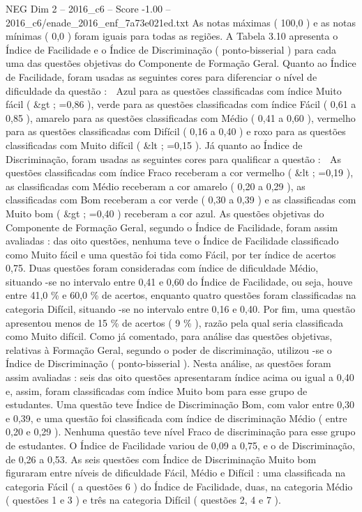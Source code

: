 \begin{textsample}{NEG Dim 2 – 2016\_c6 – Score -1.00 – 2016\_c6/enade\_2016\_enf\_7a73e021ed.txt}
As notas máximas ( 100,0 ) e as notas mínimas ( 0,0 ) foram iguais para todas as regiões.
A Tabela 3.10 apresenta o Índice de Facilidade e o Índice de Discriminação ( ponto-bisserial ) para cada uma das questões objetivas do Componente de Formação Geral.
Quanto ao Índice de Facilidade, foram usadas as seguintes cores para diferenciar o nível de dificuldade da questão :  Azul para as questões classificadas com índice Muito fácil ( \&gt ; =0,86 ), verde para as questões classificadas com índice Fácil ( 0,61 a 0,85 ), amarelo para as questões classificadas com Médio ( 0,41 a 0,60 ), vermelho para as questões classificadas com Difícil ( 0,16 a 0,40 ) e roxo para as questões classificadas com Muito difícil ( \&lt ; =0,15 ).
Já quanto ao Índice de Discriminação, foram usadas as seguintes cores para qualificar a questão :  As questões classificadas com índice Fraco receberam a cor vermelho ( \&lt ; =0,19 ), as classificadas com Médio receberam a cor amarelo ( 0,20 a 0,29 ), as classificadas com Bom receberam a cor verde ( 0,30 a 0,39 ) e as classificadas com Muito bom ( \&gt ; =0,40 ) receberam a cor azul.
As questões objetivas do Componente de Formação Geral, segundo o Índice de Facilidade, foram assim avaliadas : das oito questões, nenhuma teve o Índice de Facilidade classificado como Muito fácil e uma questão foi tida como Fácil, por ter índice de acertos 0,75.
Duas questões foram consideradas com índice de dificuldade Médio, situando -se no intervalo entre 0,41 e 0,60 do Índice de Facilidade, ou seja, houve entre 41,0 \% e 60,0 \% de acertos, enquanto quatro questões foram classificadas na categoria Difícil, situando -se no intervalo entre 0,16 e 0,40.
Por fim, uma questão apresentou menos de 15 \% de acertos ( 9 \% ), razão pela qual seria classificada como Muito difícil.
Como já comentado, para análise das questões objetivas, relativas à Formação Geral, segundo o poder de discriminação, utilizou -se o Índice de Discriminação ( ponto-bisserial ).
Nesta análise, as questões foram assim avaliadas : seis das oito questões apresentaram índice acima ou igual a 0,40 e, assim, foram classificadas com índice Muito bom para esse grupo de estudantes.
Uma questão teve Índice de Discriminação Bom, com valor entre 0,30 e 0,39, e uma questão foi classificada com índice de discriminação Médio ( entre 0,20 e 0,29 ).
Nenhuma questão teve nível Fraco de discriminação para esse grupo de estudantes.
O Índice de Facilidade variou de 0,09 a 0,75, e o de Discriminação, de 0,26 a 0,53.
As seis questões com Índice de Discriminação Muito bom figuraram entre níveis de dificuldade Fácil, Médio e Difícil : uma classificada na categoria Fácil ( a questões 6 ) do Índice de Facilidade, duas, na categoria Médio ( questões 1 e 3 ) e três na categoria Difícil ( questões 2, 4 e 7 ).

\end{textsample}
